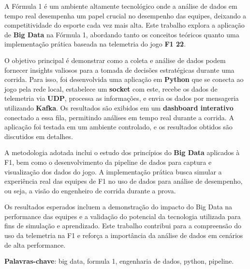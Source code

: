 \documentclass[12pt, %
openright, 
oneside, %
a4paper,    %
brazil]{facom-ufu-abntex2}
\begin{document}
\begin{resumo} %

  A Fórmula 1 é um ambiente altamente tecnológico onde a análise de dados em 
  tempo real desempenha um papel crucial no desempenho das equipes, deixando a competitividade do esporte
  cada vez mais alta. Este trabalho explora a aplicação de \textbf{Big Data} na Fórmula 1, abordando tanto os conceitos teóricos 
  quanto uma implementação prática baseada na telemetria do jogo \textbf{F1 22}.
  
  O objetivo principal é demonstrar como a coleta e análise de dados podem fornecer insights valiosos para 
  a tomada de decisões estratégicas durante uma corrida. Para isso, foi desenvolvida uma aplicação em \textbf{Python} 
  que se conecta ao jogo pela rede local, estabelece um \textbf{socket} com este, recebe os dados de telemetria via \textbf{UDP}, 
  processa as informações, e envia os dados por mensageria utilizando \textbf{Kafka}. Os resultados são exibidos em um 
  \textbf{dashboard interativo} conectado a essa fila, permitindo análises em tempo real durante a corrida. 
  A aplicação foi testada em um ambiente controlado, e os resultados obtidos são discutidos em detalhes.
  
  A metodologia adotada inclui o estudo dos princípios do \textbf{Big Data} aplicados à F1, bem como o desenvolvimento 
  da pipeline de dados para captura e visualização dos dados do jogo. A implementação prática busca simular a experiência 
  real das equipes de F1 no uso de dados para análise de desempenho, ou seja, a visão do engenheiro de corrida durante a prova.

  Os resultados esperados incluem a demonstração do impacto do Big Data na performance das equipes e a 
  validação do potencial da tecnologia utilizada para fins de simulação e aprendizado. Este trabalho contribui 
  para a compreensão do uso da telemetria na F1 e reforça a importância da análise de dados em cenários de alta performance.

 \vspace{\onelineskip}
    
 \noindent
 \textbf{Palavras-chave}: big data, formula 1, engenharia de dados, python, pipeline. %
\end{resumo}

\listoffigures*
\cleardoublepage

\listoftables*
\cleardoublepage
\end{document}
